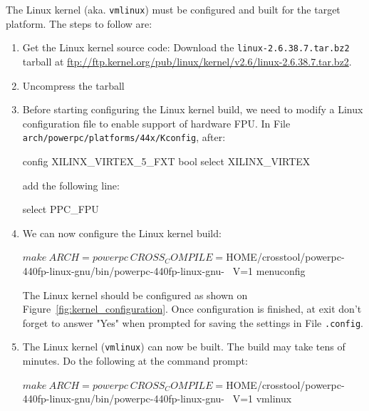 The Linux kernel (aka. \texttt{vmlinux}) must be configured and built for the target platform.
\noindent The steps to follow are:
\begin{enumerate}
\item Get the Linux kernel source code: Download the \texttt{linux-2.6.38.7.tar.bz2} tarball at \url{ftp://ftp.kernel.org/pub/linux/kernel/v2.6/linux-2.6.38.7.tar.bz2}.
\item Uncompress the tarball
\item Before starting configuring the Linux kernel build, we need to modify a Linux configuration file to enable support of hardware FPU.
In File \texttt{arch/powerpc/platforms/44x/Kconfig}, after:
\begin{script}
 config XILINX_VIRTEX_5_FXT
        bool
        select XILINX_VIRTEX
\end{script}
\noindent add the following line:
\begin{script}
        select PPC_FPU
\end{script}
\item We can now configure the Linux kernel build:
\begin{script}
$ make \
    ARCH=powerpc \
    CROSS_COMPILE=${HOME}/crosstool/powerpc-440fp-linux-gnu/bin/powerpc-440fp-linux-gnu- \
    V=1 menuconfig
\end{script}
The Linux kernel should be configured as shown on Figure~\ref{fig:kernel_configuration}.
Once configuration is finished, at exit don't forget to answer "Yes" when prompted for saving the settings in File \texttt{.config}.
\item The Linux kernel (\texttt{vmlinux}) can now be built.
The build may take tens of minutes.
Do the following at the command prompt:
\begin{script}
$ make \
    ARCH=powerpc \
    CROSS_COMPILE=${HOME}/crosstool/powerpc-440fp-linux-gnu/bin/powerpc-440fp-linux-gnu- \
    V=1 vmlinux
\end{script}
\end{enumerate}



